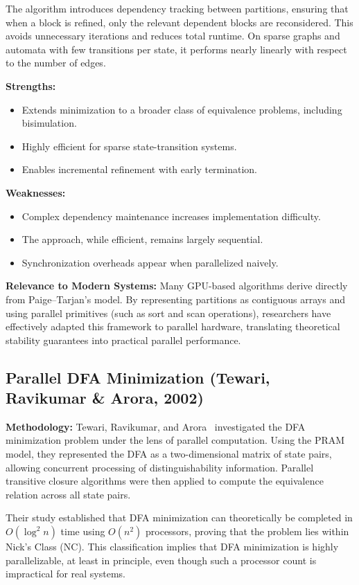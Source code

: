 The algorithm introduces dependency tracking between partitions, ensuring that when a block is refined, only the relevant dependent blocks are reconsidered. This avoids unnecessary iterations and reduces total runtime. On sparse graphs and automata with few transitions per state, it performs nearly linearly with respect to the number of edges.

\textbf{Strengths:}
\begin{itemize}
    \item Extends minimization to a broader class of equivalence problems, including bisimulation.
    \item Highly efficient for sparse state-transition systems.
    \item Enables incremental refinement with early termination.
\end{itemize}

\textbf{Weaknesses:}
\begin{itemize}
    \item Complex dependency maintenance increases implementation difficulty.
    \item The approach, while efficient, remains largely sequential.
    \item Synchronization overheads appear when parallelized naively.
\end{itemize}

\textbf{Relevance to Modern Systems:}
Many GPU-based algorithms derive directly from Paige–Tarjan’s model. By representing partitions as contiguous arrays and using parallel primitives (such as sort and scan operations), researchers have effectively adapted this framework to parallel hardware, translating theoretical stability guarantees into practical parallel performance.

\subsection{Parallel DFA Minimization (Tewari, Ravikumar \& Arora, 2002)}

\textbf{Methodology:}
Tewari, Ravikumar, and Arora~\cite{tewari2002} investigated the DFA minimization problem under the lens of parallel computation. Using the PRAM model, they represented the DFA as a two-dimensional matrix of state pairs, allowing concurrent processing of distinguishability information. Parallel transitive closure algorithms were then applied to compute the equivalence relation across all state pairs.

Their study established that DFA minimization can theoretically be completed in $O(\log^2 n)$ time using $O(n^2)$ processors, proving that the problem lies within Nick’s Class (NC). This classification implies that DFA minimization is highly parallelizable, at least in principle, even though such a processor count is impractical for real systems.

